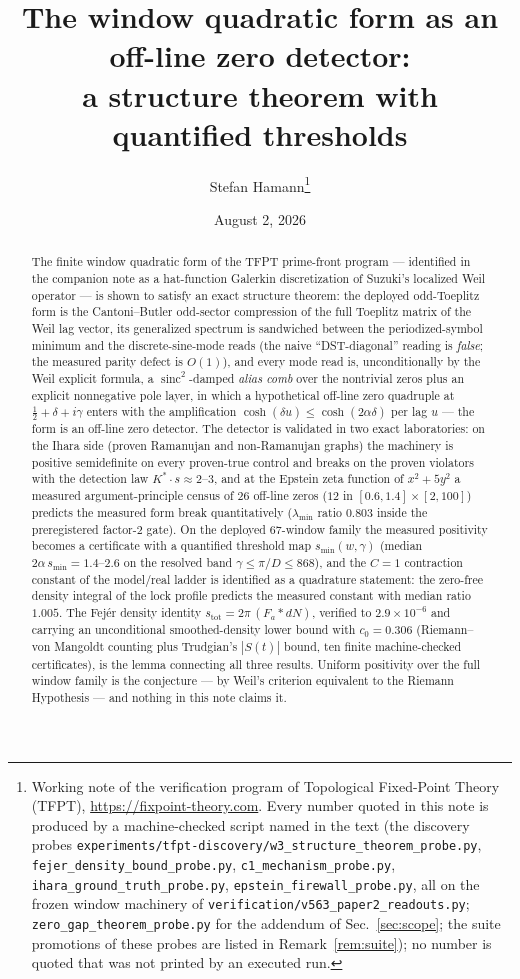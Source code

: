 \documentclass[11pt,a4paper]{article}
\title{The window quadratic form as an off-line zero detector:\\
a structure theorem with quantified thresholds}
\author{Stefan Hamann\thanks{Working note of the verification program
of Topological Fixed-Point Theory (TFPT),
\url{https://fixpoint-theory.com}.  Every number quoted in this note is
produced by a machine-checked script named in the text (the discovery
probes \texttt{experiments/tfpt-discovery/w3\_structure\_theorem\_probe.py},
\texttt{fejer\_density\_bound\_probe.py}, \texttt{c1\_mechanism\_probe.py},
\texttt{ihara\_ground\_truth\_probe.py},
\texttt{epstein\_firewall\_probe.py}, all on the frozen window machinery
of \texttt{verification/v563\_paper2\_readouts.py};
\texttt{zero\_gap\_theorem\_probe.py} for the addendum of
Sec.~\ref{sec:scope}; the suite promotions of these probes are listed
in Remark~\ref{rem:suite}); no number is quoted
that was not printed by an executed run.}}
\date{August 2, 2026}
\theoremstyle{remark}
\DeclareMathOperator{\sinc}{sinc}
\begin{document}
\maketitle

\begin{abstract}
The finite window quadratic form of the TFPT prime-front program ---
identified in the companion note \cite{HamW1} as a hat-function Galerkin
discretization of Suzuki's localized Weil operator --- is shown to satisfy
an exact structure theorem: the deployed odd-Toeplitz form is the
Cantoni--Butler odd-sector compression of the full Toeplitz matrix of the
Weil lag vector, its generalized spectrum is sandwiched between the
periodized-symbol minimum and the discrete-sine-mode reads (the naive
``DST-diagonal'' reading is \emph{false}; the measured parity defect is
$O(1)$), and every mode read is, unconditionally by the Weil explicit
formula, a $\sinc^2$-damped \emph{alias comb} over the nontrivial zeros
plus an explicit nonnegative pole layer, in which a hypothetical off-line
zero quadruple at $\tfrac12+\delta+i\gamma$ enters with the amplification
$\cosh(\delta u)\le\cosh(2\alpha\delta)$ per lag $u$ --- the form is an
off-line zero detector.  The detector is validated in two exact
laboratories: on the Ihara side (proven Ramanujan and non-Ramanujan
graphs) the machinery is positive semidefinite on every proven-true
control and breaks on the proven violators with the detection law
$K^*\!\cdot s\approx 2$--$3$, and at the Epstein zeta function of
$x^2+5y^2$ a measured argument-principle census of $26$ off-line zeros
($12$ in $[0.6,1.4]\times[2,100]$) predicts the measured form break
quantitatively ($\lambda_{\min}$ ratio $0.803$ inside the preregistered
factor-$2$ gate).  On the deployed $67$-window family the measured
positivity becomes a certificate with a quantified threshold map
$s_{\min}(w,\gamma)$ (median $2\alpha\,s_{\min}=1.4$--$2.6$ on the
resolved band $\gamma\le\pi/D\le 868$), and the $C=1$ contraction
constant of the model/real ladder is identified as a quadrature
statement: the zero-free density integral of the lock profile predicts
the measured constant with median ratio $1.005$.  The Fej\'er density
identity $s_{\mathrm{tot}}=2\pi\,(F_a\ast dN)$, verified to
$2.9\times10^{-6}$ and carrying an unconditional smoothed-density lower
bound with $c_0=0.306$ (Riemann--von Mangoldt counting plus Trudgian's
$|S(t)|$ bound, ten finite machine-checked certificates), is the lemma
connecting all three results.  Uniform positivity over the full window
family is the conjecture --- by Weil's criterion equivalent to the
Riemann Hypothesis \cite{Weil52,Yoshida92,BL99} --- and nothing in this
note claims it.
\end{abstract}
\end{document}
